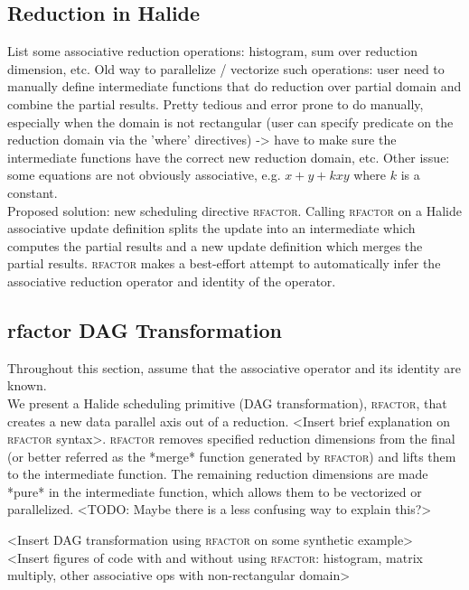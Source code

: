 \subsection{Reduction in Halide}

List some associative reduction operations: histogram, sum over reduction dimension, etc. Old way to parallelize / vectorize such operations: user need to manually define intermediate functions that do reduction over partial domain and combine the partial results. Pretty tedious and error prone to do manually, especially when the domain is not rectangular (user can specify predicate on the reduction domain via the 'where' directives) -> have to make sure the intermediate functions have the correct new reduction domain, etc. Other issue: some equations are not obviously associative, e.g. $x + y + kxy$ where $k$ is a constant. \\

Proposed solution: new scheduling directive \textsc{rfactor}. Calling \textsc{rfactor} on a Halide associative update definition splits the update into an intermediate which computes the partial results and a new update definition which merges the partial results. \textsc{rfactor} makes a best-effort attempt to automatically infer the associative reduction operator and identity of the operator.

\subsection{rfactor DAG Transformation}

Throughout this section, assume that the associative operator and its identity are known. \\

We present a Halide scheduling primitive (DAG transformation), \textsc{rfactor}, that creates a new data parallel axis out of a reduction. <Insert brief explanation on \textsc{rfactor} syntax>. \textsc{rfactor} removes specified reduction dimensions from the final (or better referred as the *merge* function generated by \textsc{rfactor}) and lifts them to the intermediate function. The remaining reduction dimensions are made *pure* in the intermediate function, which allows them to be vectorized or parallelized. <TODO: Maybe there is a less confusing way to explain this?>

<Insert DAG transformation using \textsc{rfactor} on some synthetic example> \\

<Insert figures of code with and without using \textsc{rfactor}: histogram, matrix multiply, other associative ops with non-rectangular domain> \\

